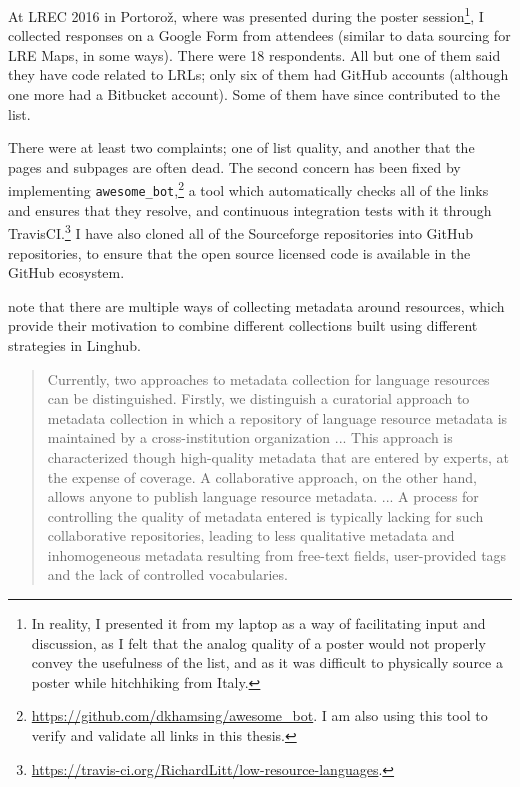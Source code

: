 At LREC 2016 in Portoro\v{z}, where \citet{CCURL} was presented during the poster session\footnote{In reality, I presented it from my laptop as a way of facilitating input and discussion, as I felt that the analog quality of a poster would not properly convey the usefulness of the list, and as it was difficult to physically source a poster while hitchhiking from Italy.}, I collected responses on a Google Form from attendees (similar to data sourcing for LRE Maps, in some ways). There were 18 respondents. All but one of them said they have code related to LRLs; only six of them had GitHub accounts (although one more had a Bitbucket account). Some of them have since contributed to the list.

There were at least two complaints; one of list quality, and another that the pages and subpages are often dead. The second concern has been fixed by implementing {\tt awesome\_bot},\footnote{\href{https://github.com/dkhamsing/awesome_bot}{https://github.com/dkhamsing/awesome\_bot}.  I am also using this tool to verify and validate all links in this thesis.} a tool which automatically checks all of the links and ensures that they resolve, and continuous integration tests with it through TravisCI.\footnote{\href{https://travis-ci.org/RichardLitt/low-resource-languages}{https://travis-ci.org/RichardLitt/low-resource-languages}. } I have also cloned all of the Sourceforge repositories into GitHub repositories, to ensure that the open source licensed code is available in the GitHub ecosystem.

\citet[88]{mccrae2015linghub} note that there are multiple ways of collecting metadata around resources, which provide their motivation to combine different collections built using different strategies in Linghub. 

\begin{quote}
Currently, two approaches to metadata collection for language resources can be distinguished. Firstly, we distinguish a curatorial approach to metadata collection in which a repository of language resource metadata is maintained by a cross-institution organization ... This approach is characterized though high-quality metadata that are entered by experts, at the expense of coverage. A collaborative approach, on the other hand, allows anyone to publish language resource metadata. ... A process for controlling the quality of metadata entered is typically lacking for such collaborative repositories, leading to less qualitative metadata and inhomogeneous metadata resulting from free-text fields, user-provided tags and the lack of controlled vocabularies.
\end{quote}


